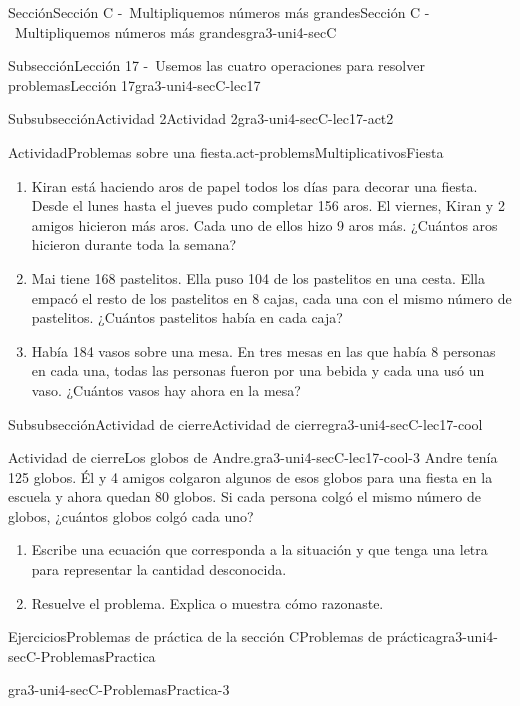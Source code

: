 \documentclass[twoside,10pt,]{article}
\begin{document}
\begin{sectionptx}{Sección}{Sección C -~Multipliquemos números más grandes}{}{Sección C -~Multipliquemos números más grandes}{}{}{gra3-uni4-secC}
\begin{subsectionptx}{Subsección}{Lección 17 -~Usemos las cuatro operaciones para resolver problemas}{}{Lección 17}{}{}{gra3-uni4-secC-lec17}
\begin{subsubsectionptx}{Subsubsección}{Actividad 2}{}{Actividad 2}{}{}{gra3-uni4-secC-lec17-act2}
\begin{activity}{Actividad}{Problemas sobre una fiesta.}{act-problemsMultiplicativosFiesta}
\begin{enumerate}
\item{}Kiran está haciendo aros de papel todos los días para decorar una fiesta. Desde el lunes hasta el jueves pudo completar 156 aros. El viernes, Kiran y 2 amigos hicieron más aros. Cada uno de ellos hizo 9 aros más. ¿Cuántos aros hicieron durante toda la semana?%
\item{}Mai tiene 168 pastelitos. Ella puso 104 de los pastelitos en una cesta. Ella empacó el resto de los pastelitos en 8 cajas, cada una con el mismo número de pastelitos. ¿Cuántos pastelitos había en cada caja?%
\item{}Había 184 vasos sobre una mesa. En tres mesas en las que había 8 personas en cada una, todas las personas fueron por una bebida y cada una usó un vaso. ¿Cuántos vasos hay ahora en la mesa?%
\end{enumerate}
\end{activity}%
\end{subsubsectionptx}
%
%
\typeout{************************************************}
\typeout{************************************************}
%
\begin{subsubsectionptx}{Subsubsección}{Actividad de cierre}{}{Actividad de cierre}{}{}{gra3-uni4-secC-lec17-cool}
\begin{project}{Actividad de cierre}{Los globos de Andre.}{gra3-uni4-secC-lec17-cool-3}%
Andre tenía 125 globos. Él y 4 amigos colgaron algunos de esos globos para una fiesta en la escuela y ahora quedan 80 globos. Si cada persona colgó el mismo número de globos, ¿cuántos globos colgó cada uno?%
%
\begin{enumerate}
\item{}Escribe una ecuación que corresponda a la situación y que tenga una letra para representar la cantidad desconocida.%
\item{}Resuelve el problema. Explica o muestra cómo razonaste.%
\end{enumerate}
\end{project}%
\end{subsubsectionptx}
\end{subsectionptx}
%
%
\typeout{************************************************}
\typeout{************************************************}
%
\begin{exercises-subsection}{Ejercicios}{Problemas de práctica de la sección C}{}{Problemas de práctica}{}{}{gra3-uni4-secC-ProblemasPractica}
\begin{divisionexercise}{1}{}{}{gra3-uni4-secC-ProblemasPractica-3}%

\end{divisionexercise}
\end{exercises-subsection}
\end{sectionptx}
\end{document}
